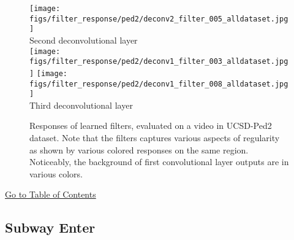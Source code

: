 \documentclass[10pt,twocolumn,letterpaper]{article}
\begin{document}
\begin{figure}[h]
	\texttt{[image: figs/filter\_response/ped2/deconv2\_filter\_005\_alldataset.jpg]}\\
	{\footnotesize Second deconvolutional layer}\\
	\texttt{[image: figs/filter\_response/ped2/deconv1\_filter\_003\_alldataset.jpg]}
	\texttt{[image: figs/filter\_response/ped2/deconv1\_filter\_008\_alldataset.jpg]}\\
	{\footnotesize Third deconvolutional layer}\\
	\caption{Responses of learned filters, evaluated on a video in UCSD-Ped2 dataset. Note that the filters captures various aspects of regularity as shown by various colored responses on the same region. Noticeably, the background of first convolutional layer outputs are in various colors.}
\end{figure}

\begin{center}
	\hyperlink{page.11}{Go to Table of Contents}
\end{center}

\clearpage

\subsection{Subway Enter}
\label{sec:filter_res_vis_enter}
\end{document}
